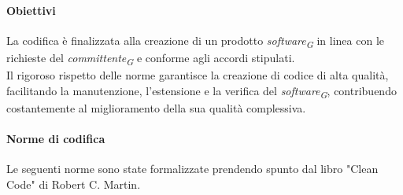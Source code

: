 \paragraph{Obiettivi}
La codifica è finalizzata alla creazione di un prodotto \textit{software}\textsubscript{\textit{G}} in linea con le richieste del \textit{committente}\textsubscript{\textit{G}} e conforme agli accordi stipulati.\\
Il rigoroso rispetto delle norme garantisce la creazione di codice di alta qualità, facilitando la manutenzione, l'estensione e la verifica del \textit{software}\textsubscript{\textit{G}}, contribuendo costantemente al miglioramento della sua qualità complessiva.
\paragraph{Norme di codifica}
Le seguenti norme sono state formalizzate prendendo spunto dal libro "Clean Code" di Robert C. Martin.

